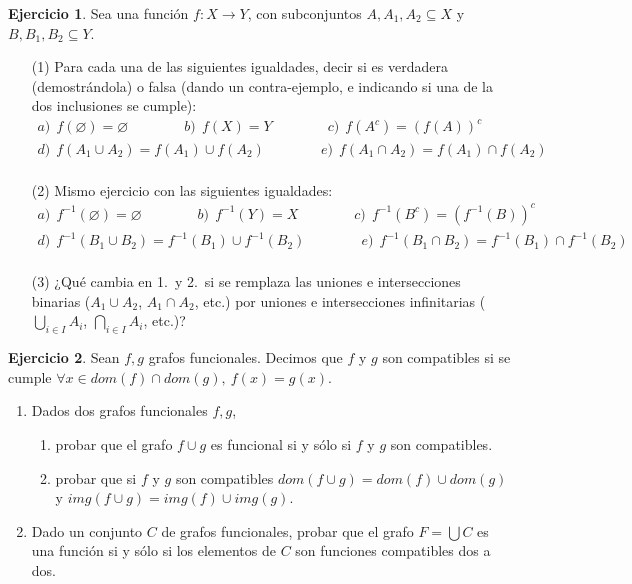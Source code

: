\documentclass[a4paper,12pt]{book}
\theoremstyle{definition}
\newtheorem{ejercicio}{Ejercicio}
\begin{document}
	\begin{ejercicio}
	Sea una función $f:X\to Y$, con subconjuntos
	$A,A_1,A_2\subseteq X$ y $B,B_1,B_2\subseteq Y$.
	\begin{enumerate}\parskip-.5ex
		\item[(1)] Para cada una de las siguientes igualdades, decir si es
		verdadera (demostrándola) o falsa (dando un contra-ejemplo, e
		indicando si una de la dos inclusiones se cumple):
		$$\begin{array}{c}
			a)~~f(\varnothing)=\varnothing\qquad\qquad
			b)~~f(X)=Y\qquad\qquad c)~~f(A^c)=(f(A))^c\\[3pt]
			d)~~f(A_1\cup A_2)=f(A_1)\cup f(A_2)\qquad\qquad
			e)~~f(A_1\cap A_2)=f(A_1)\cap f(A_2)\\
		\end{array}$$
		\item[(2)] Mismo ejercicio con las siguientes igualdades:
		$$\begin{array}{c}
			a)~~f^{-1}(\varnothing)=\varnothing\qquad\qquad
			b)~~f^{-1}(Y)=X\qquad\qquad c)~~f^{-1}(B^c)=(f^{-1}(B))^c\\[3pt]
			d)~~f^{-1}(B_1\cup B_2)=f^{-1}(B_1)\cup f^{-1}(B_2)\qquad\qquad
			e)~~f^{-1}(B_1\cap B_2)=f^{-1}(B_1)\cap f^{-1}(B_2)\\
		\end{array}$$
		\item[(3)] ¿Qué cambia en 1.\ y 2.\ si se remplaza las uniones e
		intersecciones binarias ($A_1\cup A_2$, $A_1\cap A_2$, etc.) por
		uniones e intersecciones infinitarias ($\bigcup_{i\in I}A_i$,
		$\bigcap_{i\in I}A_i$, etc.)?
	\end{enumerate}
\end{ejercicio}
	
	\begin{ejercicio}
		Sean $f,g$ grafos funcionales. Decimos que $f$ y $g$ son compatibles si se cumple $\forall x \in dom(f)\cap dom(g),~f(x)=g(x)$.
		\begin{enumerate}\parskip -.5ex
			\item Dados dos grafos funcionales $f,g$, \begin{enumerate}\parskip -.5ex
				\item probar que el grafo $f\cup g$ es funcional si y s\'olo si $f$ y $g$ son compatibles. 
				
				\item probar que si $f$ y $g$ son compatibles $dom(f\cup g)=dom(f)\cup dom(g)$ y $img(f\cup g)=img(f)\cup img(g)$.
			\end{enumerate}
			\item Dado un conjunto $C$ de grafos funcionales, probar que el grafo $F=\bigcup C$ es una funci\'on si y s\'olo si los elementos de $C$ son funciones compatibles dos a dos.
		\end{enumerate}
	\end{ejercicio}
	
\end{document}
